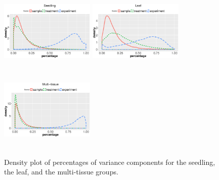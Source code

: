 \documentclass[letterpaper,12pt]{article}
\begin{document}
 \begin{figure}[h]
\begin{center}
\includegraphics[width=4.5cm,height=4cm]{Figures/var_dens1.eps}
\includegraphics[width=4.5cm,height=4cm]{Figures/var_dens2.eps}
\includegraphics[width=4.5cm,height=4cm]{Figures/var_dens3.eps}
\caption{ Density plot of percentages of variance components for the seedling, the leaf, and the multi-tissue groups.}
\label{fig:densityplot}
\end{center}
\end{figure} 
\end{document}
